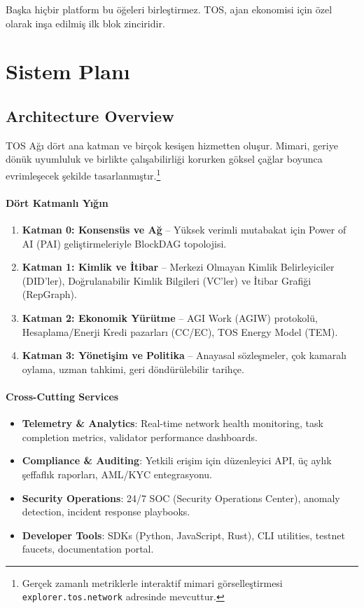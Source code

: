 \documentclass[11pt]{article}
\begin{document}
Başka hiçbir platform bu öğeleri birleştirmez. TOS, ajan ekonomisi için özel olarak inşa edilmiş ilk blok zinciridir.

\section{Sistem Planı}
\subsection{Architecture Overview}
TOS Ağı dört ana katman ve birçok kesişen hizmetten oluşur. Mimari, geriye dönük uyumluluk ve birlikte çalışabilirliği korurken göksel çağlar boyunca evrimleşecek şekilde tasarlanmıştır.\footnote{Gerçek zamanlı metriklerle interaktif mimari görselleştirmesi \texttt{explorer.tos.network} adresinde mevcuttur.}

\paragraph{Dört Katmanlı Yığın}
\begin{enumerate}[noitemsep]
  \item \textbf{Katman 0: Konsensüs ve Ağ} -- Yüksek verimli mutabakat için Power of AI (PAI) geliştirmeleriyle BlockDAG topolojisi.
  \item \textbf{Katman 1: Kimlik ve İtibar} -- Merkezi Olmayan Kimlik Belirleyiciler (DID'ler), Doğrulanabilir Kimlik Bilgileri (VC'ler) ve İtibar Grafiği (RepGraph).
  \item \textbf{Katman 2: Ekonomik Yürütme} -- AGI Work (AGIW) protokolü, Hesaplama/Enerji Kredi pazarları (CC/EC), TOS Energy Model (TEM).
  \item \textbf{Katman 3: Yönetişim ve Politika} -- Anayasal sözleşmeler, çok kamaralı oylama, uzman tahkimi, geri döndürülebilir tarihçe.
\end{enumerate}

\paragraph{Cross-Cutting Services}
\begin{itemize}[noitemsep]
  \item \textbf{Telemetry \& Analytics}: Real-time network health monitoring, task completion metrics, validator performance dashboards.
  \item \textbf{Compliance \& Auditing}: Yetkili erişim için düzenleyici API, üç aylık şeffaflık raporları, AML/KYC entegrasyonu.
  \item \textbf{Security Operations}: 24/7 SOC (Security Operations Center), anomaly detection, incident response playbooks.
  \item \textbf{Developer Tools}: SDKs (Python, JavaScript, Rust), CLI utilities, testnet faucets, documentation portal.
\end{itemize}
\end{document}
